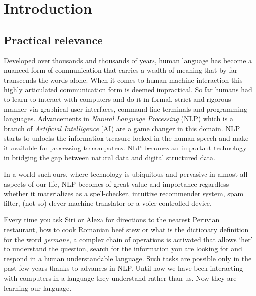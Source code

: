 \chapter{Introduction}

\section{Practical relevance}
Developed over thousands and thousands of years, human language has become a nuanced form of communication that carries a wealth of meaning that by far transcends the words alone. When it comes to human-machine interaction this highly articulated communication form is deemed impractical. So far humans had to learn to interact with computers and do it in  formal, strict and rigorous manner via graphical user interfaces, command line terminals and programming languages. Advancements in \textit{Natural Language Processing} (NLP) which is a branch of \textit{Artificial Intelligence} (AI) are a game changer in this domain. NLP starts to unlocks the information treasure locked in the human speech and make it available for processing to computers. NLP becomes an important technology in bridging the gap between natural data and digital structured data.

In a world such ours, where technology is ubiquitous and pervasive in almost all aspects of our life, NLP becomes of great value and importance regardless whether it materializes as a spell-checker, intuitive recommender system, spam filter, (not so) clever machine translator or a voice controlled device. 

Every time you ask Siri or Alexa for directions to the nearest Peruvian restaurant, how to cook Romanian beef stew or what is the dictionary definition for the word \textit{germane}, a complex chain of operations is activated that allows `her' to understand the question, search for the information you are looking for and respond in a human understandable language. Such tasks are possible only in the past few years thanks to advances in NLP. Until now we have been interacting with computers in a language they understand rather than us. Now they are learning our language. 


